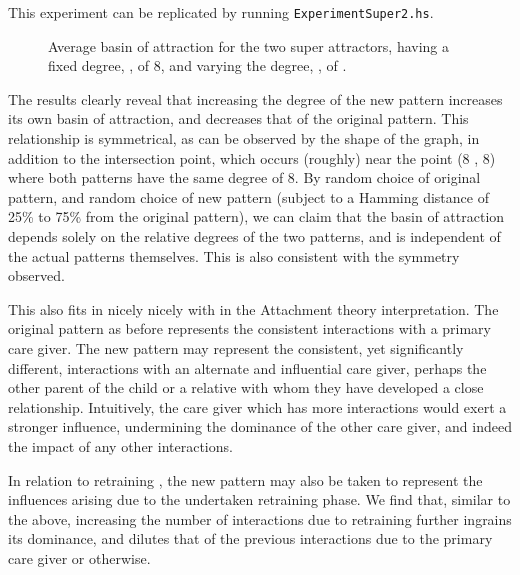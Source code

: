 This experiment can be replicated by running \texttt{ExperimentSuper2.hs}. 

\begin{figure}[h]
  \centering

\caption{Average basin of attraction for the two super attractors, \poriginsuper having a fixed degree, \dorigin, of 8, and varying the degree, \dnew, of \pnewsuper.}
\label{fig:two super plot}
\end{figure}


The results clearly reveal that increasing the degree of the new pattern increases its own basin of attraction, and decreases that of the original pattern. This relationship is symmetrical, as can be observed by the shape of the graph, in addition to the intersection point, which occurs (roughly) near the point (8 , 8) where both patterns have the same degree of 8. By random choice of original pattern, and random choice of new pattern (subject to a Hamming distance of 25\% to 75\% from the original pattern), we can claim that the basin of attraction depends solely on the relative degrees of the two patterns, and is independent of the actual patterns themselves. This is also consistent with the symmetry observed.

This also fits in nicely nicely with in the Attachment theory interpretation. The original pattern as before represents the consistent interactions with a primary care giver. The new pattern may represent the consistent, yet significantly different, interactions with an alternate and influential care giver, perhaps the other parent of the child or a relative with whom they have developed a close relationship. Intuitively, the care giver which has more interactions would exert a stronger influence, undermining the dominance of the other care giver, and indeed the impact of any other interactions.

In relation to retraining , the new pattern may also be taken to represent the influences arising due to the undertaken retraining phase. We find that, similar to the above, increasing the number of interactions due to retraining further ingrains its dominance, and dilutes that of the previous interactions due to the primary care giver or otherwise.


\let\psuper\undefined
\let\poriginsuper\undefined
\let\pnewsuper\undefined
\let\dorigin\undefined
\let\dnew\undefined
\let\prandom\undefined





